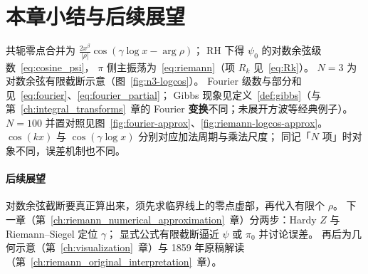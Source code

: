 \section*{本章小结与后续展望}

共轭零点合并为 $\frac{2x^{\beta}}{|\rho|}\cos(\gamma\log x-\arg\rho)$；
RH 下得 $\psi_0$ 的对数余弦级数~\eqref{eq:cosine_psi}，
$\pi$ 侧主振荡为~\eqref{eq:riemann}（项 $R_k$ 见~\eqref{eq:Rk}）。
$N=3$ 为对数余弦有限截断示意（图~\ref{fig:n3-logcos}）。
Fourier 级数与部分和见~\eqref{eq:fourier}、\eqref{eq:fourier_partial}；
Gibbs 现象见定义~\ref{def:gibbs}（与第~\ref{ch:integral_transforms}~章的 Fourier
\textbf{变换}不同；未展开方波等经典例子）。
$N=100$ 并置对照见图~\ref{fig:fourier-approx}、\ref{fig:riemann-logcos-approx}。
$\cos(kx)$ 与 $\cos(\gamma\log x)$ 分别对应加法周期与乘法尺度；
同记「$N$ 项」时对象不同，误差机制也不同。

\begin{center}
\end{center}

\paragraph{后续展望}
对数余弦截断要真正算出来，须先求临界线上的零点虚部，再代入有限个 $\rho$。
下一章（第~\ref{ch:riemann_numerical_approximation}~章）分两步：Hardy $Z$ 与 Riemann--Siegel 定位 $\gamma$；
显式公式有限截断逼近 $\psi$ 或 $\pi_0$ 并讨论误差。
再后为几何示意（第~\ref{ch:visualization}~章）与 1859 年原稿解读
（第~\ref{ch:riemann_original_interpretation}~章）。
